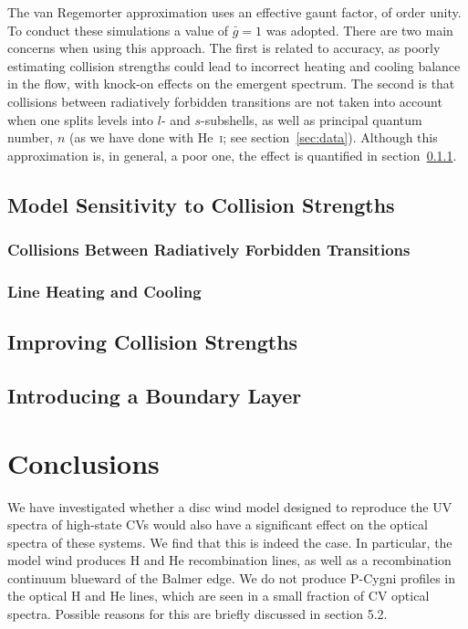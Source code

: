 The van Regemorter approximation uses an effective gaunt factor, of
order unity. To conduct these simulations a value of $\bar{g}=1$ 
was adopted. There are two main concerns when using this approach.
The first is related to accuracy, as poorly estimating collision strengths
could lead to incorrect heating and cooling balance in the flow, with
knock-on effects on the emergent spectrum. The second is that 
collisions between radiatively forbidden transitions are not taken into 
account when one splits levels into $l$- and $s$-subshells, as well
as principal quantum number, $n$ (as we have done with He~\textsc{i}; 
see section~\ref{sec:data}). Although this approximation is, in general, 
a poor one, the effect is quantified in section~\ref{sec:rad_forbid}.

\subsection{Model Sensitivity to Collision Strengths}

\subsubsection{Collisions Between Radiatively Forbidden Transitions}
\label{sec:rad_forbid}

\subsubsection{Line Heating and Cooling}
\label{sec:line_heat}

\subsection{Improving Collision Strengths}


\subsection{Introducing a Boundary Layer}



%
%


\section{Conclusions}

We have investigated whether a disc wind model designed to reproduce
the UV spectra of high-state CVs would also have a significant effect
on the optical spectra of these systems. We find that this is indeed
the case. In particular, the model wind produces H and He
recombination lines, as well as a recombination continuum blueward of
the Balmer edge. We do not produce P-Cygni profiles
in the optical H and He lines, 
which are seen in a small fraction of CV optical spectra.
Possible reasons for this are briefly discussed in section 
5.2.

